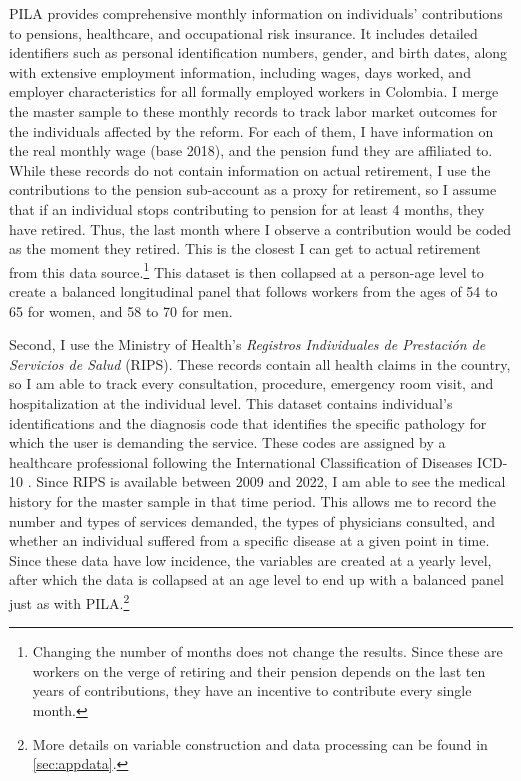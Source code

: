 \documentclass[12pt, a4paper]{article}
\begin{document}
PILA provides comprehensive monthly information on individuals' contributions to pensions, healthcare, and occupational risk insurance. It includes detailed identifiers such as personal identification numbers, gender, and birth dates, along with extensive employment information, including wages, days worked, and employer characteristics for all formally employed workers in Colombia. I merge the master sample to these monthly records to track labor market outcomes for the individuals affected by the reform. For each of them, I have information on the real monthly wage (base 2018), and the pension fund they are affiliated to. While these records do not contain information on actual retirement, I use the contributions to the pension sub-account as a proxy for retirement, so I assume that if an individual stops contributing to pension for at least 4 months, they have retired. Thus, the last month where I observe a contribution would be coded as the moment they retired. This is the closest I can get to actual retirement from this data source.\footnote{Changing the number of months does not change the results. Since these are workers on the verge of retiring and their pension depends on the last ten years of contributions, they have an incentive to contribute every single month.} This dataset is then collapsed at a person-age level to create a balanced longitudinal panel that follows workers from the ages of 54 to 65 for women, and 58 to 70 for men.

Second, I use the Ministry of Health's \textit{Registros Individuales de Prestación de Servicios de Salud} (RIPS). These records contain all health claims in the country, so I am able to track every consultation, procedure, emergency room visit, and hospitalization at the individual level. This dataset contains individual's identifications and the diagnosis code that identifies the specific pathology for which the user is demanding the service. These codes are assigned by a healthcare professional following the International Classification of Diseases ICD-10 \citep{icd10}. Since RIPS is available between 2009 and 2022, I am able to see the medical history for the master sample in that time period. This allows me to record the number and types of services demanded, the types of physicians consulted, and whether an individual suffered from a specific disease at a given point in time. Since these data have low incidence, the variables are created at a yearly level, after which the data is collapsed at an age level to end up with a balanced panel just as with PILA.\footnote{More details on variable construction and data processing can be found in \autoref{sec:appdata}.}
\end{document}
